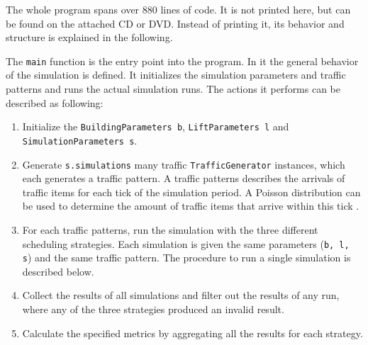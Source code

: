 The whole program spans over 880 lines of code.
It is not printed here, but can be found on the attached CD or DVD.
Instead of printing it, its behavior and structure is explained in the following.

The \texttt{main} function is the entry point into the program.
In it the general behavior of the simulation is defined.
It initializes the simulation parameters and traffic patterns and runs the actual simulation runs.
The actions it performs can be described as following:
\begin{enumerate}
    \item Initialize the \texttt{BuildingParameters b}, \texttt{LiftParameters l} and\\ \texttt{SimulationParameters s}.
    \item Generate \texttt{s.simulations} many traffic \texttt{TrafficGenerator} instances, which each generates a traffic pattern. A traffic patterns describes the arrivals of traffic items for each tick of the simulation period. A Poisson distribution can be used to determine the amount of traffic items that arrive within this tick \autocite{beers2015arrivals}.
    \item For each traffic patterns, run the simulation with the three different scheduling strategies. Each simulation is given the same parameters (\texttt{b, l, s}) and the same traffic pattern. The procedure to run a single simulation is described below.
    \item Collect the results of all simulations and filter out the results of any run, where any of the three strategies produced an invalid result.
    \item Calculate the specified metrics by aggregating all the results for each strategy.
\end{enumerate}

